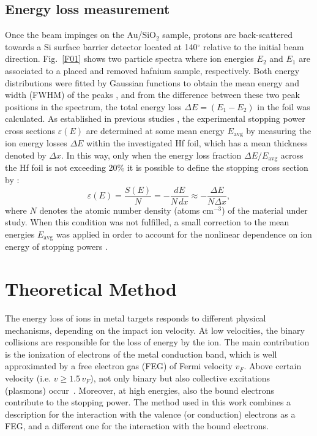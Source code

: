 \documentclass[aps,pra,reprint,groupedaddress,showpacs,showkeys]{revtex4-1}
\begin{document}
\subsection{Energy loss measurement}
Once the beam impinges on the Au/SiO$_2$ sample, protons are 
back-scattered towards a Si surface barrier detector located at 
140$^{\circ}$ relative to the initial beam direction. Fig.~\ref{F01} 
shows two particle spectra where ion energies $E_2$ and $E_1$ are 
associated to a placed and removed hafnium sample, respectively. Both 
energy distributions were fitted by Gaussian functions to obtain the 
mean energy and width (FWHM) of the peaks \cite{Sun01}, and from the 
difference between these two peak positions in the spectrum, the total 
energy loss $\Delta E = (E_1 - E_2)$ in the foil was calculated. As 
established in previous studies \cite{Miranda01,Damache02}, the 
experimental stopping power cross sections $\varepsilon (E) $ are 
determined at some mean energy $E_{\mathrm{avg}}$ by measuring the ion 
energy losses $\Delta E$ within the investigated Hf foil, which has a 
mean thickness denoted by $\Delta x$. In this way, only when the energy 
loss fraction $\Delta E/E_{\mathrm{avg}}$ across the Hf foil is not 
exceeding 20\% it is possible to define the stopping cross section by 
\cite{Raisanen01,Schulz01}:
\begin{equation}\label{eq:stcross}
 \varepsilon(E)=\frac{S(E)}{N}=-\frac{dE}{N\,dx}\approx-\frac{\Delta E}{N\Delta x},
\end{equation}
where $N$ denotes the atomic number density (atoms cm$^{-3}$) of the 
material under study. When this condition was not fulfilled, a small 
correction to the mean energies $E_{\mathrm{avg}}$ was applied in order 
to account for the nonlinear dependence on ion energy of stopping 
powers \cite{Chilton,Rajatora}.


\section{Theoretical Method} 
\label{theory}
The energy loss of ions in metal targets responds to different physical 
mechanisms, depending on the impact ion velocity. At low velocities, the 
binary collisions are responsible for the loss of energy by the ion. 
The main contribution is the ionization of electrons of the metal 
conduction band, which is well approximated by a free electron gas (FEG) 
of Fermi velocity $v_F$. Above certain velocity (i.e. $v\geq 1.5\,v_F$), 
not only binary but also collective excitations (plasmons) 
occur~\cite{mon17}. Moreover, at high energies, also the bound electrons 
contribute to the stopping power. The method used in this work combines 
a description for the interaction with the valence (or conduction) 
electrons as a FEG, and a different one for the interaction with the 
bound electrons.
\end{document}
